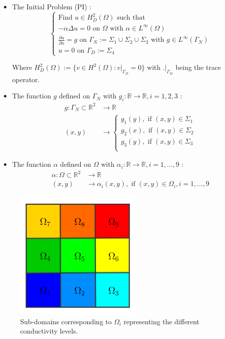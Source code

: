 \documentclass[a4paper]{report}
\begin{document}
\begin{itemize}
\item The Initial Problem (PI) : 
\begin{equation}\label{eq:1}
\left\{
\begin{array}{l}
\text{Find $u\in H^2_D(\Omega)$ such that}\\
-\alpha \Delta u = 0 \text{ on $\Omega$ with $\alpha \in L^\infty (\Omega)$}\\
\frac{\partial u}{\partial n}=g \text{ on $\Gamma_N:=\Sigma_1 \cup \Sigma_2 \cup \Sigma_3$ with $g\in L^\infty (\Gamma_N)$}\\
u=0 \text{ on $\Gamma_D := \Sigma_4$}
\end{array}
\right.
\end{equation}

Where $H^2_D(\Omega):=\{ v \in H^2(\Omega) : v|_{\Gamma_D}=0\}$ with $.|_{\Gamma_D}$ being the trace operator.
\item 
The function $g$ defined on $\Gamma_N$ with $g_i : \mathbb{R} \rightarrow \mathbb{R} ,i=1,2,3$ :
\begin{align*}
g:\Gamma_N \subset \mathbb{R}^2 &\rightarrow \mathbb{R} \\
(x,y)&\rightarrow \left\{
\begin{array}{l}
g_1(y), \text{ if }(x,y) \in \Sigma_1\\
g_2(x),\text{ if }(x,y) \in \Sigma_2\\
g_3(y),\text{ if }(x,y) \in \Sigma_3\\
\end{array}
\right.
\end{align*}
\item The function $\alpha$ defined on $\Omega$ with $\alpha_i : \mathbb{R} \rightarrow \mathbb{R} ,i=1,...,9$ : 
\begin{align*}
\alpha:\Omega \subset \mathbb{R}^2 &\rightarrow \mathbb{R} \\
(x,y)&\rightarrow
\alpha_i(x,y), \text{ if }(x,y) \in \Omega_i, i=1,...,9
\end{align*}


\end{itemize}

\begin{figure}[H]
\begin{center}
\includegraphics[scale=0.40]{subdomain.png}\caption{Sub-domains corresponding to $\Omega_i$ representing the different conductivity levels.}
\end{center}
\end{figure}
\end{document}
